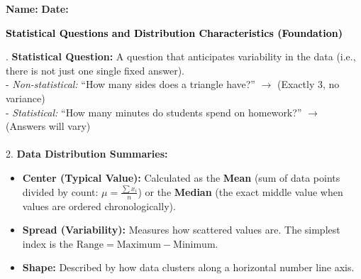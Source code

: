 \documentclass[12pt, letterpaper, fleqn]{article}
\begin{document}
\textbf{Name:} \underline{\hspace{5cm}}
\hfill
\textbf{Date:} \underline{\hspace{3cm}}\\

\begin{tcolorbox}[colback=black!10]
    \large\textcolor{black}{\textbf{Statistical Questions and Distribution Characteristics (Foundation)}}
\end{tcolorbox}

\vspace{2mm}

. \textbf{Statistical Question:} A question that anticipates variability in the data (i.e., there is not just one single fixed answer). \\
- \textit{Non-statistical:} ``How many sides does a triangle have?'' $\rightarrow$ (Exactly 3, no variance) \\
- \textit{Statistical:} ``How many minutes do students spend on homework?'' $\rightarrow$ (Answers will vary) \\ \\
\vspace{0.2cm}
2. \textbf{Data Distribution Summaries:} 
\begin{itemize}[itemsep=0.3cm, leftmargin=0.5cm]
    \item \textbf{Center (Typical Value):} Calculated as the \textbf{Mean} (sum of data points divided by count: $\mu = \frac{\sum x_i}{n}$) or the \textbf{Median} (the exact middle value when values are ordered chronologically).
    \item \textbf{Spread (Variability):} Measures how scattered values are. The simplest index is the $\text{Range} = \text{Maximum} - \text{Minimum}$.
    \item \textbf{Shape:} Described by how data clusters along a horizontal number line axis.
\end{itemize}
\end{document}
